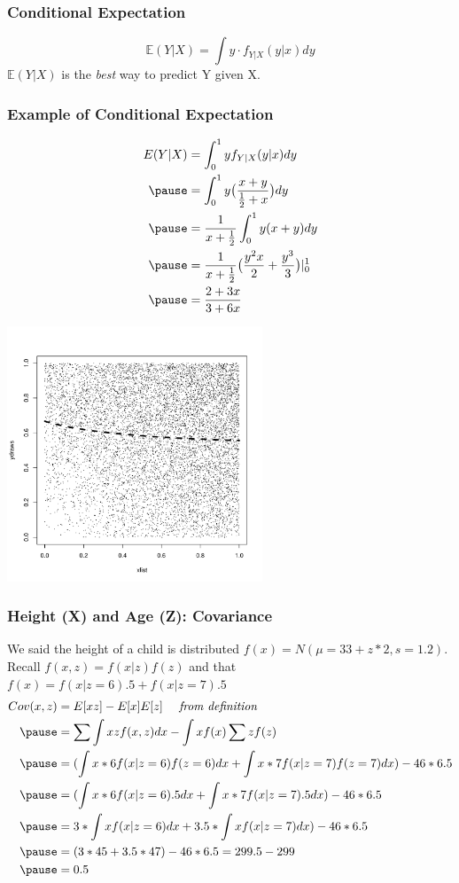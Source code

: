 \documentclass[aspectratio=169, handout]{beamer}
\numberwithin{equation}{section}
\begin{document}
\begin{frame}
\frametitle{Conditional Expectation}
$$\mathbb{E}(Y|X)=\int y\cdot f_{Y|X} (y|x)dy $$
$\mathbb{E}(Y|X)$ is the \emph{best} way to predict Y given X.

\end{frame}


\begin{frame}
\frametitle{Example of Conditional Expectation}
\begin{align*}
E(Y|X)&=\int_0^1 y f_{Y|X}(y|x)dy\\ \pause
&=\int_0^1 y \big(\frac{x+y}{\frac{1}{2}+x}\big)dy \\\pause
&=\frac{1}{x+\frac{1}{2}}\int_0^1 y (x+y)dy\\\pause
&=\frac{1}{x+\frac{1}{2}} \big(\frac{y^2x}{2} +\frac{y^3}{3}\big) |_0^1\\\pause
&=\frac{2+3x}{3+6x}
\end{align*}
\end{frame}


\begin{frame}
\begin{center}
\includegraphics[width=3in]{images/ConditionalExp1.pdf}
\end{center}
\end{frame}




\begin{frame}
\frametitle{Height (X) and Age (Z): Covariance}

We said the height of a child is distributed $f(x)=N(\mu=33+z*2, s= 1.2)$.  \\
Recall $f(x,z)=f(x|z)f(z)$ and that $f(x)=f(x|z=6).5+f(x|z=7).5$
\begin{align*}
Cov(x,z)&=E[xz]-E[x]E[z]  \quad \textit{ from definition}\\\pause
&=\sum\int xz f(x,z)dx- \int x f(x) \sum z f(z)\\\pause
&=(\int x*6 f(x|z=6)f(z=6)dx+\int x*7 f(x|z=7)f(z=7)dx)- 46*6.5\\\pause
&=(\int x*6 f(x|z=6).5dx+\int x*7 f(x|z=7).5dx)- 46*6.5\\\pause
&=3*\int x f(x|z=6)dx+3.5*\int x f(x|z=7)dx)- 46*6.5\\\pause
&=(3*45+3.5*47)- 46*6.5 =299.5-299\\\pause
&=0.5
\end{align*}
\end{frame}
\end{document}
